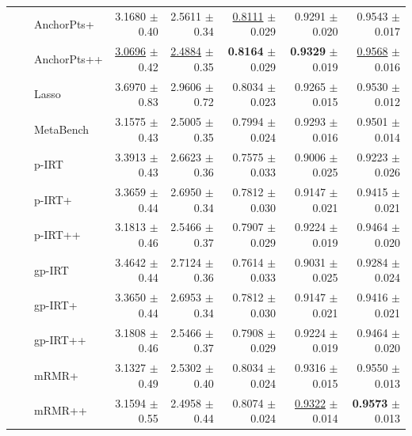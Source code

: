 \begin{longtable}{llp{}rrrrr}
 &  & AnchorPts+ & 3.1680 {\scriptsize $\pm$ 0.40} & 2.5611 {\scriptsize $\pm$ 0.34} & \underline{0.8111} {\scriptsize $\pm$ 0.029} & 0.9291 {\scriptsize $\pm$ 0.020} & 0.9543 {\scriptsize $\pm$ 0.017} \\
 &  & AnchorPts++ & \underline{3.0696} {\scriptsize $\pm$ 0.42} & \underline{2.4884} {\scriptsize $\pm$ 0.35} & \textbf{0.8164} {\scriptsize $\pm$ 0.029} & \textbf{0.9329} {\scriptsize $\pm$ 0.019} & \underline{0.9568} {\scriptsize $\pm$ 0.016} \\
 &  & Lasso & 3.6970 {\scriptsize $\pm$ 0.83} & 2.9606 {\scriptsize $\pm$ 0.72} & 0.8034 {\scriptsize $\pm$ 0.023} & 0.9265 {\scriptsize $\pm$ 0.015} & 0.9530 {\scriptsize $\pm$ 0.012} \\
 &  & MetaBench & 3.1575 {\scriptsize $\pm$ 0.43} & 2.5005 {\scriptsize $\pm$ 0.35} & 0.7994 {\scriptsize $\pm$ 0.024} & 0.9293 {\scriptsize $\pm$ 0.016} & 0.9501 {\scriptsize $\pm$ 0.014} \\
 &  & p-IRT & 3.3913 {\scriptsize $\pm$ 0.43} & 2.6623 {\scriptsize $\pm$ 0.36} & 0.7575 {\scriptsize $\pm$ 0.033} & 0.9006 {\scriptsize $\pm$ 0.025} & 0.9223 {\scriptsize $\pm$ 0.026} \\
 &  & p-IRT+ & 3.3659 {\scriptsize $\pm$ 0.44} & 2.6950 {\scriptsize $\pm$ 0.34} & 0.7812 {\scriptsize $\pm$ 0.030} & 0.9147 {\scriptsize $\pm$ 0.021} & 0.9415 {\scriptsize $\pm$ 0.021} \\
 &  & p-IRT++ & 3.1813 {\scriptsize $\pm$ 0.46} & 2.5466 {\scriptsize $\pm$ 0.37} & 0.7907 {\scriptsize $\pm$ 0.029} & 0.9224 {\scriptsize $\pm$ 0.019} & 0.9464 {\scriptsize $\pm$ 0.020} \\
 &  & gp-IRT & 3.4642 {\scriptsize $\pm$ 0.44} & 2.7124 {\scriptsize $\pm$ 0.36} & 0.7614 {\scriptsize $\pm$ 0.033} & 0.9031 {\scriptsize $\pm$ 0.025} & 0.9284 {\scriptsize $\pm$ 0.024} \\
 &  & gp-IRT+ & 3.3650 {\scriptsize $\pm$ 0.44} & 2.6953 {\scriptsize $\pm$ 0.34} & 0.7812 {\scriptsize $\pm$ 0.030} & 0.9147 {\scriptsize $\pm$ 0.021} & 0.9416 {\scriptsize $\pm$ 0.021} \\
 &  & gp-IRT++ & 3.1808 {\scriptsize $\pm$ 0.46} & 2.5466 {\scriptsize $\pm$ 0.37} & 0.7908 {\scriptsize $\pm$ 0.029} & 0.9224 {\scriptsize $\pm$ 0.019} & 0.9464 {\scriptsize $\pm$ 0.020} \\
 &  & mRMR+ & 3.1327 {\scriptsize $\pm$ 0.49} & 2.5302 {\scriptsize $\pm$ 0.40} & 0.8034 {\scriptsize $\pm$ 0.024} & 0.9316 {\scriptsize $\pm$ 0.015} & 0.9550 {\scriptsize $\pm$ 0.013} \\
 &  & mRMR++ & 3.1594 {\scriptsize $\pm$ 0.55} & 2.4958 {\scriptsize $\pm$ 0.44} & 0.8074 {\scriptsize $\pm$ 0.024} & \underline{0.9322} {\scriptsize $\pm$ 0.014} & \textbf{0.9573} {\scriptsize $\pm$ 0.013} \\

\end{longtable}
